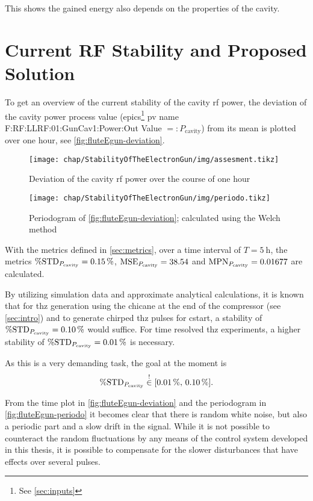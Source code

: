 This shows the gained energy also depends on the properties of the cavity.

\section{Current RF Stability and Proposed Solution}
To get an overview of the current stability of the cavity \gls{rf} power, the deviation of the cavity power process value (\gls{epics}\footnote{See \autoref{sec:inputs}} \gls{pv} name F:RF:LLRF:01:GunCav1:Power:Out Value $=:P_\text{cavity}$) from its mean is plotted over one hour, see \autoref{fig:fluteEgun-deviation}.

\begin{figure}[tb]
	\centering
	\texttt{[image: chap/StabilityOfTheElectronGun/img/assesment.tikz]}
	\caption{Deviation of the cavity \gls{rf} power over the course of one hour}
	\label{fig:fluteEgun-deviation}
\end{figure}

\begin{figure}[tb]
	\centering
	\texttt{[image: chap/StabilityOfTheElectronGun/img/periodo.tikz]}
	\caption{Periodogram of \autoref{fig:fluteEgun-deviation}; calculated using the Welch method}
	\label{fig:fluteEgun-periodo}
\end{figure}

With the metrics defined in \autoref{sec:metrics}, over a time interval of $T=\SI{5}{\hour}$, the metrics $\operatorname{\%STD}_{P_\text{cavity}}=\SI{0.15}{\percent}$, $\operatorname{MSE}_{P_\text{cavity}}=38.54$ and $\operatorname{MPN}_{P_\text{cavity}}=0.01677$ are calculated.

By utilizing simulation data and approximate analytical calculations, it is known that for \gls{thz} generation using the chicane at the end of the compressor (see \autoref{sec:intro}) and to generate chirped \gls{thz} pulses for \gls{cstart}, a stability of $\operatorname{\%STD}_{P_\text{cavity}}=\SI{0.10}{\percent}$ would suffice. For time resolved \gls{thz} experiments, a higher stability of $\operatorname{\%STD}_{P_\text{cavity}}=\SI{0.01}{\percent}$ is necessary. \cite{Nigel2021}

As this is a very demanding task, the goal at the moment is 
\begin{equation}\label{eq:goalstd}
\operatorname{\%STD}_{P_\text{cavity}} \overset{!}{\in} [\SI{0.01}{\percent},\,\SI{0.10}{\percent}].
\end{equation}


From the time plot in \autoref{fig:fluteEgun-deviation} and the periodogram in \autoref{fig:fluteEgun-periodo} it becomes clear that there is random white noise, but also a periodic part and a slow drift in the signal. While it is not possible to counteract the random fluctuations by any means of the control system developed in this thesis, it is possible to compensate for the slower disturbances that have effects over several pulses.

